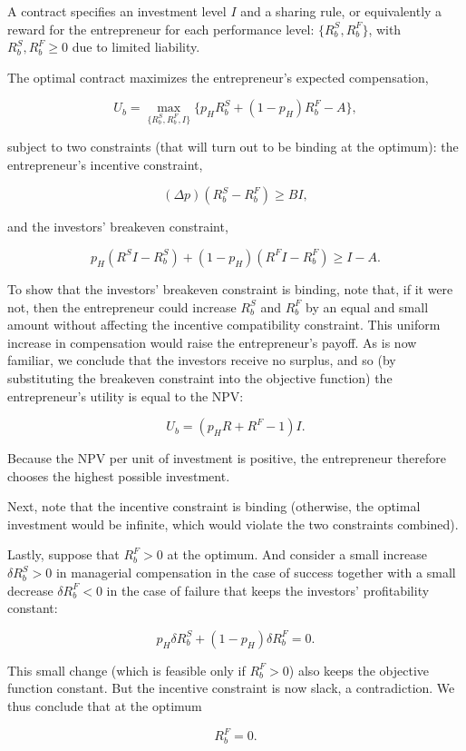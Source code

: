 \documentclass[11pt,a4paper]{article}
\begin{document}
A contract specifies an investment level \(I\) and a sharing rule, or equivalently a reward for the
entrepreneur for each performance level: \(\{R_b^S, R_b^F\}\), with \(R_b^S, R_b^F \geqslant 0\) due
to limited liability.

The optimal contract maximizes the entrepreneur's expected compensation,

\[U_b = \max_{\{R_b^S, R_b^F, I\}} \{p_H R_b^S + (1 - p_H) R_b^F - A\},\]

subject to two constraints (that will turn out to be binding at the optimum): the entrepreneur's
incentive constraint,

\[(\Delta p)(R_b^S - R_b^F) \geqslant BI,\]

and the investors' breakeven constraint,

\[p_H(R^S I - R_b^S) + (1 - p_H)(R^F I - R_b^F) \geqslant I - A.\]

To show that the investors' breakeven constraint is binding, note that, if it were not, then the
entrepreneur could increase \(R_b^S\) and \(R_b^F\) by an equal and small amount without affecting
the incentive compatibility constraint. This uniform increase in compensation would raise the
entrepreneur's payoff. As is now familiar, we conclude that the investors receive no surplus, and so
(by substituting the breakeven constraint into the objective function) the entrepreneur's utility is
equal to the NPV:

\[U_b = (p_H R + R^F - 1) I.\]

Because the NPV per unit of investment is positive, the entrepreneur therefore chooses the highest
possible investment.

Next, note that the incentive constraint is binding (otherwise, the optimal investment would be
infinite, which would violate the two constraints combined).

Lastly, suppose that \(R_b^F > 0\) at the optimum. And consider a small increase
\(\delta R_b^S > 0\) in managerial compensation in the case of success together with a small
decrease \(\delta R_b^F < 0\) in the case of failure that keeps the investors' profitability
constant:

\[p_H \delta R_b^S + (1 - p_H) \delta R_b^F = 0.\]

This small change (which is feasible only if \(R_b^F > 0\)) also keeps the objective function
constant. But the incentive constraint is now slack, a contradiction. We thus conclude that at the
optimum

\[R_b^F = 0.\]
\end{document}
